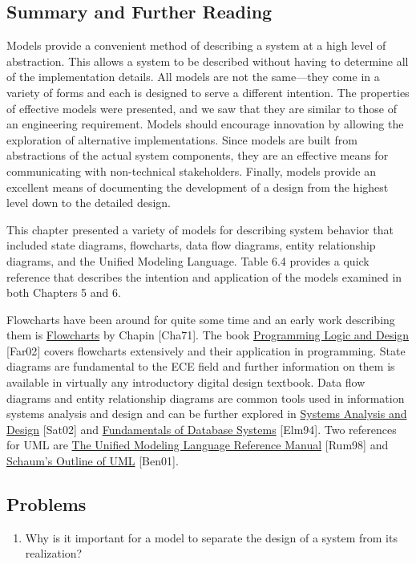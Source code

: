 \subsection{Summary and Further
Reading}\label{summary-and-further-reading}

Models provide a convenient method of describing a system at a high
level of abstraction. This allows a system to be described without
having to determine all of the implementation details. All models are
not the same---they come in a variety of forms and each is designed to
serve a different intention. The properties of effective models were
presented, and we saw that they are similar to those of an engineering
requirement. Models should encourage innovation by allowing the
exploration of alternative implementations. Since models are built from
abstractions of the actual system components, they are an effective
means for communicating with non-technical stakeholders. Finally, models
provide an excellent means of documenting the development of a design
from the highest level down to the detailed design.

This chapter presented a variety of models for describing system
behavior that included state diagrams, flowcharts, data flow diagrams,
entity relationship diagrams, and the Unified Modeling Language. Table
6.4 provides a quick reference that describes the intention and
application of the models examined in both Chapters 5 and 6.

Flowcharts have been around for quite some time and an early work
describing them is \ul{Flowcharts} by Chapin {[}Cha71{]}. The book
\ul{Programming Logic and Design} {[}Far02{]} covers flowcharts
extensively and their application in programming. State diagrams are
fundamental to the ECE field and further information on them is
available in virtually any introductory digital design textbook. Data
flow diagrams and entity relationship diagrams are common tools used in
information systems analysis and design and can be further explored in
\ul{Systems Analysis and Design} {[}Sat02{]} and \ul{Fundamentals of
Database Systems} {[}Elm94{]}. Two references for UML are \ul{The
Unified Modeling Language Reference Manual} {[}Rum98{]} and \ul{Schaum's
Outline of UML} {[}Ben01{]}.

\subsection{Problems}\label{problems}

\begin{enumerate}
\def\labelenumi{\arabic{enumi}.}
\item
  Why is it important for a model to separate the design of a system
  from its realization?
\end{enumerate}

